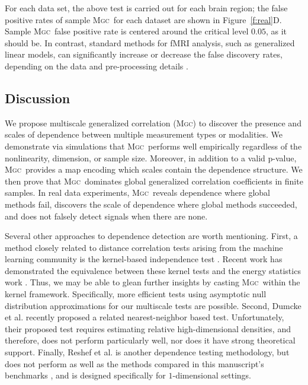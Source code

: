 \documentclass[11pt]{article}
\providecommand{\sct}[1]{{\normalfont\textsc{#1}}}
\newcommand{\Mgc}{\sct{Mgc}}
\begin{document}
For each data set, the above test is carried out for each brain region; the false positive rates of sample \Mgc~for each dataset are shown in Figure~\ref{f:real}{\color{magenta}D}. %
Sample \Mgc~false positive rate is centered around the critical level $0.05$, as it should be.
In contrast,  standard methods for fMRI analysis, such as generalized linear models, can significantly increase or decrease the false discovery rates, depending on the data and pre-processing details \cite{EklundKnutsson2012,Eklund2015}.

\subsection*{Discussion}
\label{conclu}

We propose multiscale generalized correlation (\Mgc) to discover the presence and scales of dependence between multiple measurement types or modalities.
We demonstrate via simulations that \Mgc~performs well empirically regardless of the nonlinearity, dimension, or sample size.  Moreover, in addition to a valid p-value, \Mgc~provides a map encoding which scales contain the dependence structure. We then prove that \Mgc~dominates global generalized correlation coefficients in finite samples.
In real data experiments, \Mgc~reveals dependence where global methods fail, discovers the scale of dependence where global methods succeeded, and does not falsely detect signals when there are none.


Several other approaches to dependence detection are worth mentioning.
First, a method closely related to distance correlation tests arising from the machine learning community is the kernel-based independence test  \cite{GrettonEtAl2005, GrettonGyorfi2010, GrettonEtAl2012}.  Recent work has demonstrated the equivalence between these kernel tests and the energy statistics work \cite{SejdinovicEtAl2013, RamdasEtAl2015}. Thus, we may be able to glean further insights by casting \Mgc~within the kernel framework. Specifically, more efficient tests using asymptotic null distribution approximations for our multiscale tests are possible.
Second, Dumcke et al. \cite{Dumcke2014} recently proposed a related nearest-neighbor based test.  Unfortunately, their proposed test requires estimating relative high-dimensional densities, and therefore, does not perform particularly well, nor does it have strong theoretical support.
Finally, Reshef et al. \cite{Reshef2011} is another dependence testing methodology, but does not perform as well as the methods compared in this manuscript's  benchmarks \cite{SimonTibshirani2012}, and is designed specifically for $1$-dimensional settings.
\end{document}
